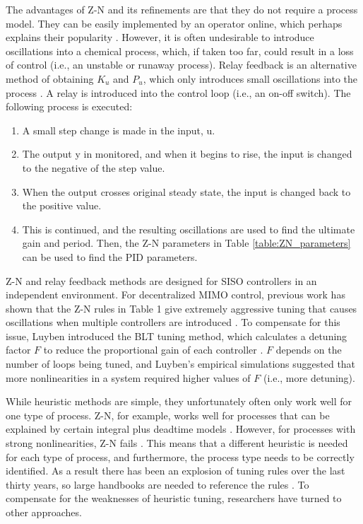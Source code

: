 The advantages of Z-N and its refinements\cite{Hang1991} are that they do not require a process model. They can be easily implemented by an operator online, which perhaps explains their popularity \cite{KiamHeongAng2005}. However, it is often undesirable to introduce oscillations into a chemical process, which, if taken too far, could result in a loss of control (i.e., an unstable or runaway process). Relay feedback is an alternative method of obtaining $K_u$ and $P_u$, which only introduces small oscillations into the process \cite{Shen1994}. A relay is introduced into the control loop (i.e., an on-off switch).  The following process is executed: 
\begin{enumerate}
    \item A small step change is made in the input, u.
    \item The output y in monitored, and when it begins to rise, the input is changed to the negative of the step value.
    \item When the output crosses original steady state, the input is changed back to the positive value.
    \item 	This is continued, and the resulting oscillations are used to find the ultimate gain and period. Then, the Z-N parameters in Table \ref{table:ZN_parameters} can be used to find the PID parameters. 
\end{enumerate}


Z-N and relay feedback methods are designed for SISO controllers in an independent environment. For decentralized MIMO control, previous work has shown that the Z-N rules in Table 1 give extremely aggressive tuning that causes oscillations when multiple controllers are introduced \cite{Riggs2006}. To compensate for this issue, Luyben introduced the BLT tuning method, which calculates a detuning factor $F$ to reduce the proportional gain of each controller \cite{Luyben1986}. $F$ depends on the number of loops being tuned, and Luyben's empirical simulations suggested that more nonlinearities in a system required higher values of $F$ (i.e., more detuning).

While heuristic methods are simple, they unfortunately often only work well for one type of process. Z-N, for example, works well for processes that can be explained by certain integral plus deadtime models \cite{ODwyer2009}. However, for  processes with strong nonlinearities, Z-N fails \cite{Hang1991}. This means that a different heuristic is needed for each type of process, and furthermore, the process type needs to be correctly identified. As a result there has been an explosion of tuning rules over the last thirty years, so large handbooks are needed to reference the rules \cite{ODwyer2009}. To compensate for the weaknesses of heuristic tuning, researchers have turned to other approaches.
 
